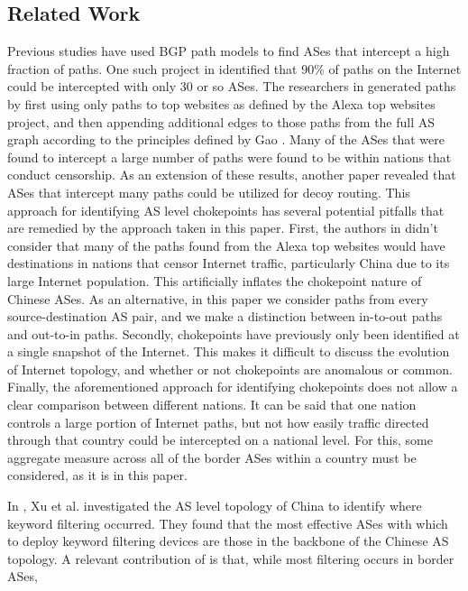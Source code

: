 \documentclass{article}
\begin{document}
\begin{multicols}{2}
\section{Related Work}   
\par
Previous studies have used BGP path models to find ASes that
intercept a high fraction of paths. One such project in \cite{throats}
identified that 90\% of paths on the Internet could be intercepted with only 30
or so ASes. The researchers in \cite{throats} generated paths by first using
only paths to top websites as defined by the Alexa top websites project,
and then appending additional edges to those paths from the full
AS graph according to the principles defined by Gao \cite{gao}. Many of the
ASes that were found to intercept a large number of paths were found to be
within nations that conduct censorship. As an extension of these results,
another paper \cite{decoy} revealed that ASes that intercept many paths could
be utilized for decoy routing. This approach for identifying AS level
chokepoints has several potential pitfalls that are remedied by the approach
taken in this paper. First, the authors in \cite{throats} didn't consider that
many of the paths found from the Alexa top websites would have destinations in
nations that censor Internet traffic, particularly China due to its large
Internet population. This artificially inflates the chokepoint nature of
Chinese ASes. As an alternative, in this paper we consider paths from every
source-destination AS pair, and we make a distinction between in-to-out paths
and out-to-in paths. Secondly, chokepoints have previously only been
identified at a single snapshot of the Internet. This makes it difficult to
discuss the evolution of Internet topology, and whether or not chokepoints are
anomalous or common. Finally, the aforementioned approach for identifying
chokepoints does not allow a clear comparison between different nations. It
can be said that one nation controls a large portion of Internet paths, but
not how easily traffic directed through that country could be intercepted on a
national level. For this, some aggregate measure across all of the border ASes
within a country must be considered, as it is in this paper.     
\par
In \cite{chinafiltering}, Xu et al. investigated the AS level topology of China
to identify where keyword filtering occurred. They found that the most
effective ASes with which to deploy keyword filtering devices are those in the
backbone of the Chinese AS topology. A relevant contribution of
\cite{chinafiltering} is that, while most filtering occurs in border ASes,

\end{multicols}
\end{document}

